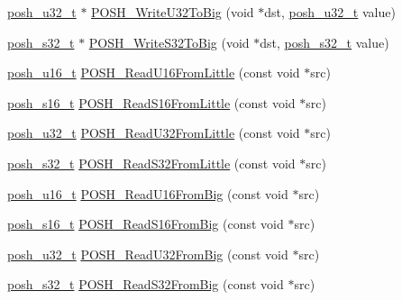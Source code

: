 \begin{DoxyCompactItemize}
\item 
\hyperlink{group__PoshTypes_ga020bf929bf912667f0fa4312d816c2e0}{posh\+\_\+u32\+\_\+t} $\ast$ \hyperlink{group__MemoryBuffer_ga50e70604bd589ee0e31bb05ffa894025}{P\+O\+S\+H\+\_\+\+Write\+U32\+To\+Big} (void $\ast$dst, \hyperlink{group__PoshTypes_ga020bf929bf912667f0fa4312d816c2e0}{posh\+\_\+u32\+\_\+t} value)
\item 
\hyperlink{group__PoshTypes_gaa13412fdeac2c495d0e0278bd28ac8cb}{posh\+\_\+s32\+\_\+t} $\ast$ \hyperlink{group__MemoryBuffer_ga55857b82054acbe60119c04f5f62f0d4}{P\+O\+S\+H\+\_\+\+Write\+S32\+To\+Big} (void $\ast$dst, \hyperlink{group__PoshTypes_gaa13412fdeac2c495d0e0278bd28ac8cb}{posh\+\_\+s32\+\_\+t} value)
\item 
\hyperlink{group__PoshTypes_ga8ef2f2264276677d018795b0ff67d486}{posh\+\_\+u16\+\_\+t} \hyperlink{group__MemoryBuffer_gaf1415105ce1d48d08d2b181b9f7f267e}{P\+O\+S\+H\+\_\+\+Read\+U16\+From\+Little} (const void $\ast$src)
\item 
\hyperlink{group__PoshTypes_gabb2c3e11f94548b8c3bc63fbbe7c2110}{posh\+\_\+s16\+\_\+t} \hyperlink{group__MemoryBuffer_ga9eb41467ccc40d4234447d0f90014911}{P\+O\+S\+H\+\_\+\+Read\+S16\+From\+Little} (const void $\ast$src)
\item 
\hyperlink{group__PoshTypes_ga020bf929bf912667f0fa4312d816c2e0}{posh\+\_\+u32\+\_\+t} \hyperlink{group__MemoryBuffer_gacbf72e43b684db66c0087f51c9bd4967}{P\+O\+S\+H\+\_\+\+Read\+U32\+From\+Little} (const void $\ast$src)
\item 
\hyperlink{group__PoshTypes_gaa13412fdeac2c495d0e0278bd28ac8cb}{posh\+\_\+s32\+\_\+t} \hyperlink{group__MemoryBuffer_ga2e2ad299e028edd9d050d50dfa3a5575}{P\+O\+S\+H\+\_\+\+Read\+S32\+From\+Little} (const void $\ast$src)
\item 
\hyperlink{group__PoshTypes_ga8ef2f2264276677d018795b0ff67d486}{posh\+\_\+u16\+\_\+t} \hyperlink{group__MemoryBuffer_ga896f0a5ea23035ef39e778dbeb409d64}{P\+O\+S\+H\+\_\+\+Read\+U16\+From\+Big} (const void $\ast$src)
\item 
\hyperlink{group__PoshTypes_gabb2c3e11f94548b8c3bc63fbbe7c2110}{posh\+\_\+s16\+\_\+t} \hyperlink{group__MemoryBuffer_gaf642e7bebe90a0d68471b9fbc80042d2}{P\+O\+S\+H\+\_\+\+Read\+S16\+From\+Big} (const void $\ast$src)
\item 
\hyperlink{group__PoshTypes_ga020bf929bf912667f0fa4312d816c2e0}{posh\+\_\+u32\+\_\+t} \hyperlink{group__MemoryBuffer_ga2e4f347d47fc307e497cc9be04dd22dd}{P\+O\+S\+H\+\_\+\+Read\+U32\+From\+Big} (const void $\ast$src)
\item 
\hyperlink{group__PoshTypes_gaa13412fdeac2c495d0e0278bd28ac8cb}{posh\+\_\+s32\+\_\+t} \hyperlink{group__MemoryBuffer_ga28207cf0a49b8eee0fa5ad048f1d0957}{P\+O\+S\+H\+\_\+\+Read\+S32\+From\+Big} (const void $\ast$src)
\end{DoxyCompactItemize}


